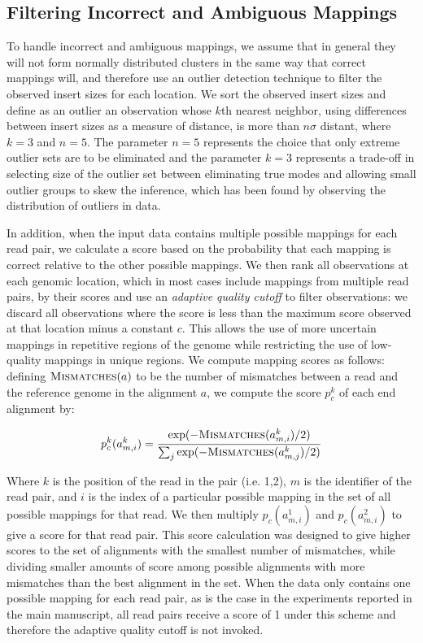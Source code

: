\documentclass[11pt]{article}
\begin{document}
\subsection{Filtering Incorrect and Ambiguous Mappings}

To handle incorrect and ambiguous mappings, we assume that in general they will not form normally distributed clusters in the same way that correct mappings will, and therefore use an outlier detection technique to filter the observed insert sizes for each location. We sort the observed insert sizes and define as an outlier an observation whose $k$th nearest neighbor, using differences between insert sizes as a measure of distance, is more than $n\sigma$ distant, where $k = 3$ and $n = 5$. The parameter $n=5$ represents the choice that only extreme outlier sets are to be eliminated and the parameter $k=3$ represents a trade-off in selecting size of the outlier set between eliminating true modes and allowing small outlier groups to skew the inference, which has been found by observing the distribution of outliers in data.

In addition, when the input data contains multiple possible mappings for each read pair, we calculate a score based on the probability that each mapping is correct relative to the other possible mappings. We then rank all observations at each genomic location, which in most cases include mappings from multiple read pairs, by their scores and use an \emph{adaptive quality cutoff} to filter observations: we discard all observations where the score is less than the maximum score observed at that location minus a constant $c$. This allows the use of more uncertain mappings in repetitive regions of the genome while restricting the use of low-quality mappings in unique regions. We compute mapping scores as follows: defining $\textsc{Mismatches}(a)$ to be the number of mismatches between a read and the reference genome in the alignment $a$, we compute the score $p^{k}_c$ of each end alignment by:

\[ p^{k}_c(a^{k}_{m,i}) = \frac{\exp({-\textsc{Mismatches}(a^{k}_{m,i})/2)}}{\sum_j{\exp(-\textsc{Mismatches}(a^{k}_{m,j})/2)}} \]

Where $k$ is the position of the read in the pair (i.e. 1,2), $m$ is the identifier of the read pair, and $i$ is the index of a particular possible mapping in the set of all possible mappings for that read. We then multiply $p_c(a^{1}_{m,i})$ and $p_c(a^{2}_{m,i})$ to give a score for that read pair. This score calculation was designed to give higher scores to the set of alignments with the smallest number of mismatches, while dividing smaller amounts of score among possible alignments with more mismatches than the best alignment in the set. When the data only contains one possible mapping for each read pair, as is the case in the experiments reported in the main manuscript, all read pairs receive a score of 1 under this scheme and therefore the adaptive quality cutoff is not invoked.
\end{document}
